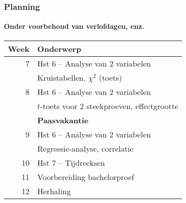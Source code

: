 \documentclass[aspectratio=169]{beamer}
\begin{document}
\begin{frame}
  \frametitle{Planning}
  \framesubtitle{Onder voorbehoud van verlofdagen, enz.}
  
  \centering
  \begin{tabular}{rl}
  	\toprule
  	\textbf{Week} & \textbf{Onderwerp}                                           \\
  	\midrule
  	            7 & Hst 6 -- Analyse van 2 variabelen                            \\
  	              & \hspace{1.25cm} Kruistabellen, $\chi^2$ (toets)              \\
  	            8 & Hst 6 -- Analyse van 2 variabelen                            \\
  	              & \hspace{1.25cm} $t$-toets voor 2 steekproeven, effectgrootte \\
  	              & \textbf{Paasvakantie}                                        \\
  	            9 & Hst 6 -- Analyse van 2 variabelen                            \\
  	              & \hspace{1.25cm} Regressie-analyse, correlatie                \\
  	           10 & Hst 7 -- Tijdreeksen                                         \\
  	           11 & Voorbereiding bachelorproef                                  \\
  	           12 & Herhaling                                                    \\
  \end{tabular}
  
\end{frame}
\end{document}
